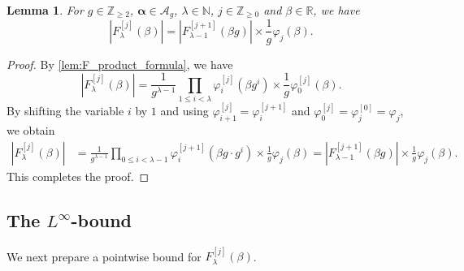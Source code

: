 \documentclass[hidelinks]{amsart}
\numberwithin{equation}{section}
\theoremstyle{plain}
\newtheorem{lemma}{Lemma}
\theoremstyle{definition}
\let\tmp\phi
\let\phi\varphi
\let\varphi\tmp
\let\tmp\epsilon
\let\epsilon\varepsilon
\let\varepsilon\tmp
\begin{document}
\begin{lemma}
\label{lem:F_recursion}
For $g\in\mathbb{Z}_{\ge2}$, $\bm{\alpha}\in\mathscr{A}_{g}$,
$\lambda\in\mathbb{N}$, $j\in\mathbb{Z}_{\ge0}$ and $\beta\in\mathbb{R}$, we have
\[
|F_{\lambda}^{[j]}(\beta)|
=
|F_{\lambda-1}^{[j+1]}(\beta g)|
\times
\frac{1}{g}
\phi_{j}(\beta).
\]
\end{lemma}
\begin{proof}
By \cref{lem:F_product_formula}, we have
\[
|F_{\lambda}^{[j]}(\beta)|
=
\frac{1}{g^{\lambda-1}}
\prod_{1\le i<\lambda}
\phi_{i}^{[j]}(\beta g^{i})
\times
\frac{1}{g}\phi_{0}^{[j]}(\beta).
\]
By shifting the variable $i$ by $1$
and using $\phi_{i+1}^{[j]}=\phi_{i}^{[j+1]}$ and $\phi_{0}^{[j]}=\phi_{j}^{[0]}=\phi_{j}$,
we obtain
\begin{align}
|F_{\lambda}^{[j]}(\beta)|
&=
\frac{1}{g^{\lambda-1}}
\prod_{0\le i<\lambda-1}
\phi_{i}^{[j+1]}(\beta g\cdot g^{i})
\times
\frac{1}{g}\phi_{j}(\beta)
=
|F_{\lambda-1}^{[j+1]}(\beta g)|
\times
\frac{1}{g}
\phi_{j}(\beta).
\end{align}
This completes the proof.
\end{proof}

\subsection{The \texorpdfstring{$L^{\infty}$}{L infinity}-bound}
\label{subsec:L_infty}
We next prepare a pointwise bound for $F_{\lambda}^{[j]}(\beta)$.
\end{document}
